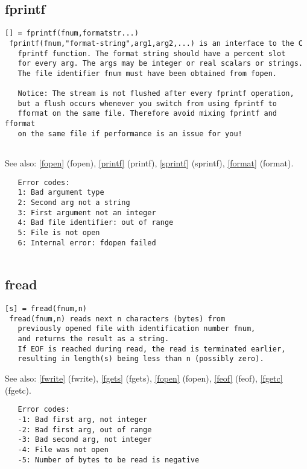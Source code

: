 \documentclass[a4paper]{article}
\begin{document}
\subsection{fprintf\label{fprintf}}

\begin{tscreen}
\begin{verbatim}
[] = fprintf(fnum,formatstr...)
 fprintf(fnum,"format-string",arg1,arg2,...) is an interface to the C
   fprintf function. The format string should have a percent slot
   for every arg. The args may be integer or real scalars or strings.
   The file identifier fnum must have been obtained from fopen.

   Notice: The stream is not flushed after every fprintf operation,
   but a flush occurs whenever you switch from using fprintf to
   fformat on the same file. Therefore avoid mixing fprintf and fformat
   on the same file if performance is an issue for you!
   
\end{verbatim}

See also: \ref{fopen} {(fopen)}, \ref{printf} {(printf)}, \ref{sprintf} {(sprintf)}, \ref{format} {(format)}.
\begin{verbatim}
   Error codes:
   1: Bad argument type
   2: Second arg not a string
   3: First argument not an integer
   4: Bad file identifier: out of range
   5: File is not open
   6: Internal error: fdopen failed
   
\end{verbatim}
\end{tscreen}



\subsection{fread\label{fread}}

\begin{tscreen}
\begin{verbatim}
[s] = fread(fnum,n)
 fread(fnum,n) reads next n characters (bytes) from
   previously opened file with identification number fnum,
   and returns the result as a string.
   If EOF is reached during read, the read is terminated earlier,
   resulting in length(s) being less than n (possibly zero).
\end{verbatim}

See also: \ref{fwrite} {(fwrite)}, \ref{fgets} {(fgets)}, \ref{fopen} {(fopen)}, \ref{feof} {(feof)}, \ref{fgetc} {(fgetc)}.
\begin{verbatim}
   Error codes:
   -1: Bad first arg, not integer
   -2: Bad first arg, out of range
   -3: Bad second arg, not integer
   -4: File was not open
   -5: Number of bytes to be read is negative
\end{verbatim}
\end{tscreen}
\end{document}
